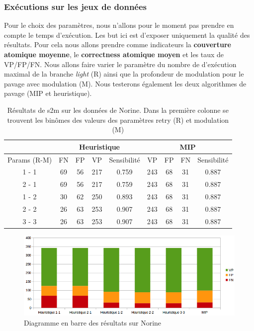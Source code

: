 \subsubsection{Exécutions sur les jeux de données}

\label{resultats_s2m_p}

Pour le choix des paramètres, nous n'allons pour le moment pas prendre en compte le temps d'exécution.
Les but ici est d'exposer uniquement la qualité des résultats.
Pour cela nous allons prendre comme indicateurs la \textbf{couverture atomique moyenne}, le \textbf{correctness atomique moyen} et les taux de VP/FP/FN.
Nous allons faire varier le paramètre du nombre de d'exécution maximal de la branche \textit{light} (R) ainsi que la profondeur de modulation pour le pavage avec modulation (M).
Nous testerons également les deux algorithmes de pavage (MIP et heuristique).

\begin{table}[!ht]
  \centering
  \begin{tabular}{|c|c|c|c|c|c|c|c|c|}
    \hline
    & \multicolumn{4}{c|}{Heuristique} & \multicolumn{4}{c|}{MIP} \\
    \hline
    Params (R-M) & FN & FP & VP & Sensibilité & VP & FP & FN & Sensibilité \\
    \hline
    1 - 1 & 69 & 56 & 217 & 0.759 & 243 & 68 & 31 & 0.887 \\
    \hline
    2 - 1 & 69 & 56 & 217 & 0.759 & 243 & 68 & 31 & 0.887 \\
    \hline
    1 - 2 & 30 & 62 & 250 & 0.893 & 243 & 68 & 31 & 0.887 \\
    \hline
    2 - 2 & 26 & 63 & 253 & 0.907 & 243 & 68 & 31 & 0.887 \\
    \hline
    3 - 3 & 26 & 63 & 253 & 0.907 & 243 & 68 & 31 & 0.887 \\
    \hline
  \end{tabular}
  \caption{\label{nor_results}Résultats de s2m sur les données de Norine.
  Dans la première colonne se trouvent les binômes des valeurs des paramètres retry (R) et modulation (M)}
\end{table}

\begin{figure}[!ht]
  \begin{center}
    \includegraphics[width=450px]{Figures/s2m/results/Norine.png}
    \caption{\label{nor_graph}Diagramme en barre des résultats sur Norine}
  \end{center}
\end{figure}

